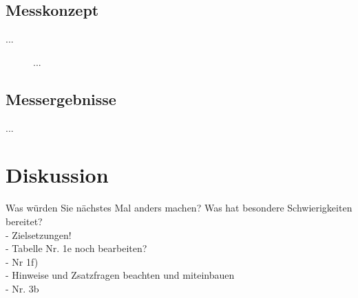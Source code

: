 \documentclass[a4paper,12pt]{article}
\begin{document}
\subsection{Messkonzept}
...

\begin{figure}[H]
    \centering
\caption{...}
\end{figure}


\subsection{Messergebnisse}
...




\section{Diskussion}
Was würden Sie nächstes Mal anders machen? Was hat besondere Schwierigkeiten bereitet?\\

- Zielsetzungen!\\

- Tabelle Nr. 1e noch  bearbeiten?\\
- Nr 1f)\\
- Hinweise und Zsatzfragen beachten und miteinbauen\\

- Nr. 3b 
\end{document}
